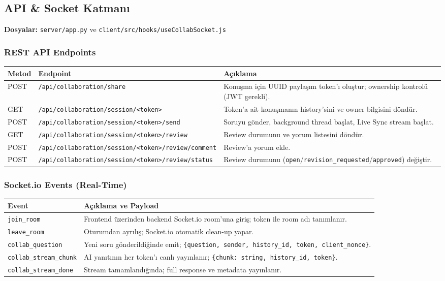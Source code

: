 \documentclass[11pt,a4paper]{article}
\begin{document}
\subsection{API \& Socket Katmanı}

\textbf{Dosyalar:} \texttt{server/app.py} ve \texttt{client/src/hooks/useCollabSocket.js}

\subsubsection{REST API Endpoints}

\begin{tabularx}{\textwidth}{@{} L{1.5cm} L{6.5cm} X @{}}
\toprule
\textbf{Metod} & \textbf{Endpoint} & \textbf{Açıklama} \\
\midrule
POST & \texttt{/api/collaboration/share} & Konuşma için UUID paylaşım token'ı oluştur; ownership kontrolü (JWT gerekli). \\
\addlinespace
GET & \texttt{/api/collaboration/session/<token>} & Token'a ait konuşmanın history'sini ve owner bilgisini döndür. \\
\addlinespace
POST & \texttt{/api/collaboration/session/<token>/send} & Soruyu gönder, background thread başlat, Live Sync stream başlat. \\
\addlinespace
GET & \texttt{/api/collaboration/session/<token>/review} & Review durumunu ve yorum listesini döndür. \\
\addlinespace
POST & \texttt{/api/collaboration/session/<token>/review/comment} & Review'a yorum ekle. \\
\addlinespace
POST & \texttt{/api/collaboration/session/<token>/review/status} & Review durumunu (\texttt{open}/\texttt{revision\_requested}/\texttt{approved}) değiştir. \\
\bottomrule
\end{tabularx}

\subsubsection{Socket.io Events (Real-Time)}

\begin{tabularx}{\textwidth}{@{} L{3.8cm} X @{}}
\toprule
\textbf{Event} & \textbf{Açıklama ve Payload} \\
\midrule
\texttt{join\_room} & Frontend üzerinden backend Socket.io room'una giriş; token ile room adı tanımlanır. \\
\addlinespace
\texttt{leave\_room} & Oturumdan ayrılış; Socket.io otomatik clean-up yapar. \\
\addlinespace
\texttt{collab\_question} & Yeni soru gönderildiğinde emit; \texttt{\{question, sender, history\_id, token, client\_nonce\}}. \\
\addlinespace
\texttt{collab\_stream\_chunk} & AI yanıtının her token'ı canlı yayınlanır; \texttt{\{chunk: string, history\_id, token\}}. \\
\addlinespace
\texttt{collab\_stream\_done} & Stream tamamlandığında; full response ve metadata yayınlanır. \\
\bottomrule
\end{tabularx}
\end{document}
